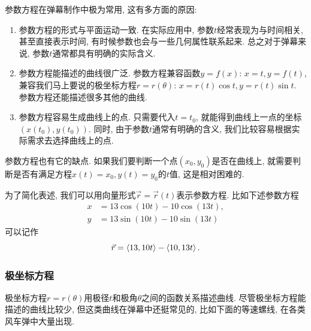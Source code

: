 参数方程在弹幕制作中极为常用, 这有多方面的原因:
\begin{enumerate}
  \item 参数方程的形式与平面运动一致.
        在实际应用中, 参数$t$经常表现为与时间相关,
        甚至直接表示时间,
        有时候参数也会与一些几何属性联系起来.
        总之对于弹幕来说, 参数$t$通常都具有明确的实际含义.
  \item 参数方程能描述的曲线很广泛.
        参数方程兼容函数$y=f(x)$: $x=t, y=f(t)$,
        兼容我们马上要说的极坐标方程$r=r(\theta)$:
        $x=r(t)\cos{t}, y=r(t)\sin{t}$.
        参数方程还能描述很多其他的曲线.
  \item 参数方程容易生成曲线上的点.
        只需要代入$t=t_0$, 就能得到曲线上一点的坐标$(x(t_0),y(t_0))$.
        同时, 由于参数$t$通常有明确的含义,
        我们比较容易根据实际需求去选择曲线上的点.
\end{enumerate}

参数方程也有它的缺点. 如果我们要判断一个点$(x_0,y_0)$是否在曲线上,
就需要判断是否有满足方程$x(t)=x_0,y(t)=y_0$的$t$值,
这是相对困难的.

为了简化表述, 我们可以用向量形式$\vec r=\vec r(t)$表示参数方程.
比如下述参数方程
\begin{align*}
  x & = 13\cos(10t) - 10\cos(13t), \\
  y & = 13\sin(10t) - 10\sin(13t)
\end{align*}
可以记作
\[
\vec r = \braket{13,10t} - \braket{10,13t}.
\]

\begin{center}
\end{center}

\subsubsection{极坐标方程}

极坐标方程$r=r(\theta)$用极径$t$和极角$\theta$之间的函数关系描述曲线.
尽管极坐标方程能描述的曲线比较少, 但这类曲线在弹幕中还挺常见的,
比如下面的等速螺线, 在各类风车弹中大量出现.

\begin{center}
\end{center}

